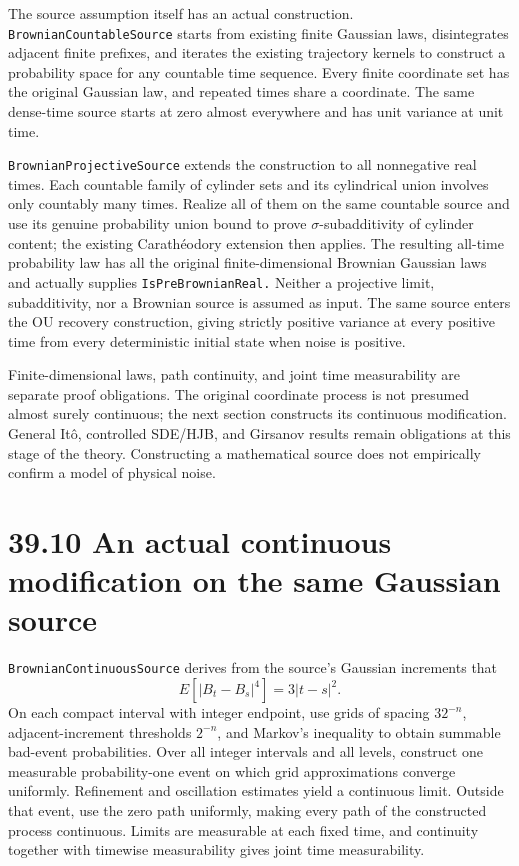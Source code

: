 \documentclass[
  english,
  11pt,
  oneside]{book}
\begin{document}
The source assumption itself has an actual construction. \nolinkurl{BrownianCountableSource} starts from existing finite Gaussian laws, disintegrates adjacent finite prefixes, and iterates the existing trajectory kernels to construct a probability space for any countable time sequence. Every finite coordinate set has the original Gaussian law, and repeated times share a coordinate. The same dense-time source starts at zero almost everywhere and has unit variance at unit time.

\nolinkurl{BrownianProjectiveSource} extends the construction to all nonnegative real times. Each countable family of cylinder sets and its cylindrical union involves only countably many times. Realize all of them on the same countable source and use its genuine probability union bound to prove \(\sigma\)-subadditivity of cylinder content; the existing Carathéodory extension then applies. The resulting all-time probability law has all the original finite-dimensional Brownian Gaussian laws and actually supplies \nolinkurl{IsPreBrownianReal.} Neither a projective limit, subadditivity, nor a Brownian source is assumed as input. The same source enters the OU recovery construction, giving strictly positive variance at every positive time from every deterministic initial state when noise is positive.

Finite-dimensional laws, path continuity, and joint time measurability are separate proof obligations. The original coordinate process is not presumed almost surely continuous; the next section constructs its continuous modification. General Itô, controlled SDE/HJB, and Girsanov results remain obligations at this stage of the theory. Constructing a mathematical source does not empirically confirm a model of physical noise.

\section{39.10 An actual continuous modification on the same Gaussian source}\label{an-actual-continuous-modification-on-the-same-gaussian-source}

\nolinkurl{BrownianContinuousSource} derives from the source's Gaussian increments that \[E[|B_t-B_s|^4]=3|t-s|^2.\] On each compact interval with integer endpoint, use grids of spacing \(32^{-n}\), adjacent-increment thresholds \(2^{-n}\), and Markov's inequality to obtain summable bad-event probabilities. Over all integer intervals and all levels, construct one measurable probability-one event on which grid approximations converge uniformly. Refinement and oscillation estimates yield a continuous limit. Outside that event, use the zero path uniformly, making every path of the constructed process continuous. Limits are measurable at each fixed time, and continuity together with timewise measurability gives joint time measurability.
\end{document}
